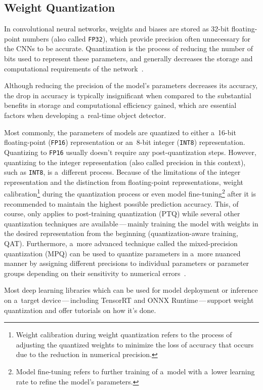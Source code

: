 \subsection{Weight Quantization}

In convolutional neural networks, weights and biases are stored as 32-bit
floating-point numbers (also called \texttt{FP32}), which provide precision often
unnecessary for the CNNs to be accurate. Quantization is the process of reducing
the number of bits used to represent these parameters, and generally decreases
the storage and computational requirements of the network~\cite{Choudhary2020}.

Although reducing the precision of the model's parameters decreases its
accuracy, the drop in accuracy is typically insignificant when compared to the
substantial benefits in storage and computational efficiency gained, which are
essential factors when developing a~real-time object detector.

Most commonly, the parameters of models are quantized to either a~16-bit
floating-point (\texttt{FP16}) representation or an~8-bit integer
(\texttt{INT8}) representation. Quantizing to \texttt{FP16} usually doesn't
require any post-quantization steps. However, quantizing to the integer
representation (also called precision in this context), such as \texttt{INT8},
is a~different process. Because of the limitations of the integer representation
and the distinction from floating-point representations, weight
calibration\footnote{Weight calibration during weight quantization refers to the
process of adjusting the quantized weights to minimize the loss of accuracy that
occurs due to the reduction in numerical precision.} during the quantization
process or even model fine-tuning\footnote{Model fine-tuning refers to further
training of a~model with a~lower learning rate to refine the model's parameters.}
after it is recommended to maintain the highest possible prediction accuracy.
This, of course, only applies to post-training quantization (PTQ) while several
other quantization techniques are available\,---\,mainly training the model with
weights in the desired representation from the beginning (quantization-aware
training, QAT). Furthermore, a~more advanced technique called the
mixed-precision quantization (MPQ) can be used to quantize parameters in a~more
nuanced manner by assigning different precisions to individual parameters or
parameter groups depending on their sensitivity to numerical
errors~\cite{Tang2022}.

Most deep learning libraries which can be used for model deployment or inference
on a~target device\,---\,including TensorRT and ONNX Runtime\,---\,support
weight quantization and offer tutorials on how it's done.


